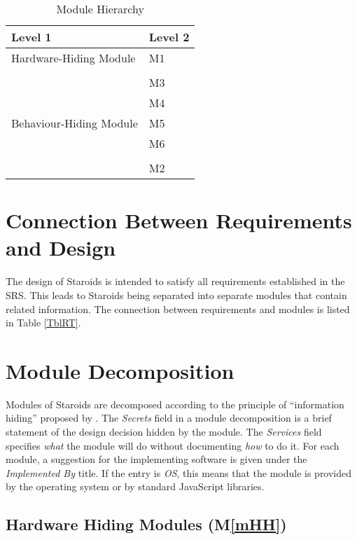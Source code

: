 \documentclass[12pt, titlepage]{article}
\newcommand{\mref}[1]{M\ref{#1}}
\begin{document}
\begin{table}[h!]
\centering
\begin{tabular}{p{} p{}}
\toprule
\textbf{Level 1} & \textbf{Level 2}\\
\midrule

{Hardware-Hiding Module} & M1 \\
\midrule

\multirow{7}{0.3\textwidth}{Behaviour-Hiding Module} & \\
& M3 \\
& M4 \\
& M5 \\
& M6 \\
\midrule

\multirow{3}{0.3\textwidth}{Software Decision Module} & \\
& M2 \\
\bottomrule

\end{tabular}
\caption{Module Hierarchy}
\label{TblMH}
\end{table}

\section{Connection Between Requirements and Design} \label{SecConnection}

The design of Staroids is intended to satisfy all requirements established in the SRS. This leads to Staroids being separated into separate modules that contain related information. The connection between requirements and modules is listed in Table \ref{TblRT}.

\section{Module Decomposition} \label{SecMD}

Modules of Staroids are decomposed according to the principle of ``information hiding'' proposed by \citet{ParnasEtAl1984}. The \emph{Secrets} field in a module decomposition is a brief statement of the design decision hidden by the module. The \emph{Services} field specifies \emph{what} the module will do without documenting \emph{how} to do it. For each module, a suggestion for the implementing software is given under the \emph{Implemented By} title. If the entry is \emph{OS}, this means that the module is provided by the operating system or by standard JavaScript libraries.

\subsection{Hardware Hiding Modules (\mref{mHH})}
\end{document}
